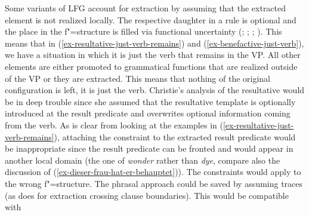Some variants of LFG account for extraction by assuming that the extracted element is not realized locally. The respective daughter
in a rule is optional and the place in the f"=structure is filled via functional uncertainty
(\citealp{KZ89a}; \citealt[]{Dalrymple2001a-u}; \citealp*{DKK2001a-u}; \citealt{ZK2002a}). This means that in
(\ref{ex-resultative-just-verb-remains}) and (\ref{ex-benefactive-just-verb}), we have a situation
in which it is just the verb that remains in the VP. All other elements are either promoted to
grammatical functions that are realized outside of the VP or they 
are extracted. This means that nothing of the original configuration is left, it is just the
verb. Christie's analysis of the resultative would be in deep trouble since she assumed that the
resultative template is optionally introduced at the result predicate and overwrites optional information coming
from the verb. As is clear from looking at the examples in (\ref{ex-resultative-just-verb-remains}),
attaching the constraint to the extracted result predicate would be inappropriate since the result
predicate can be fronted and would appear in another local domain (the one of \emph{wonder} rather
than \emph{dye}, compare also the discussion of (\ref{ex-dieser-frau-hat-er-behauptet})). The constraints would apply to
the wrong f"=structure. The phrasal approach could be saved by assuming traces (as
\citet[Chapter~6]{Berman2003a} does for extraction crossing clause boundaries). This would be compatible with

